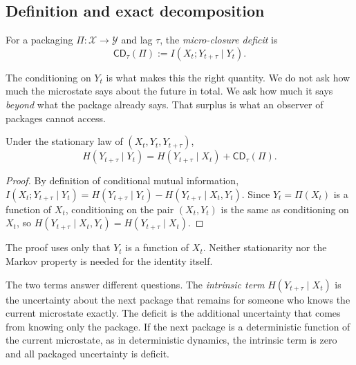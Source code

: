 \subsection{Definition and exact decomposition}

\begin{definition}\label{def:closure-deficit}
For a packaging $\Pi:\mathcal{X}\to\mathcal{Y}$ and lag $\tau$, the \emph{micro-closure deficit} is
\begin{equation}
\mathsf{CD}_\tau(\Pi)
:=
I(X_t; Y_{t+\tau} \mid Y_t).
\label{eq:closure-deficit}
\end{equation}
\end{definition}

The conditioning on $Y_t$ is what makes this the right quantity. We do not ask how much the microstate says about the future in total. We ask how much it says \emph{beyond} what the package already says. That surplus is what an observer of packages cannot access.

\begin{proposition}\label{prop:cd-decomposition}
Under the stationary law of $(X_t,Y_t,Y_{t+\tau})$,
\begin{equation}
H(Y_{t+\tau}\mid Y_t)
=
H(Y_{t+\tau}\mid X_t)
+
\mathsf{CD}_\tau(\Pi).
\label{eq:cd-decomposition}
\end{equation}
\end{proposition}

\begin{proof}
By definition of conditional mutual information,
$I(X_t;Y_{t+\tau}\mid Y_t)=H(Y_{t+\tau}\mid Y_t)-H(Y_{t+\tau}\mid X_t,Y_t)$.
Since $Y_t=\Pi(X_t)$ is a function of $X_t$, conditioning on the pair $(X_t,Y_t)$ is the same as conditioning on $X_t$, so $H(Y_{t+\tau}\mid X_t,Y_t)=H(Y_{t+\tau}\mid X_t)$.
\end{proof}

The proof uses only that $Y_t$ is a function of $X_t$. Neither stationarity nor the Markov property is needed for the identity itself.

The two terms answer different questions. The \emph{intrinsic term} $H(Y_{t+\tau}\mid X_t)$ is the uncertainty about the next package that remains for someone who knows the current microstate exactly. The deficit is the additional uncertainty that comes from knowing only the package. If the next package is a deterministic function of the current microstate, as in deterministic dynamics, the intrinsic term is zero and all packaged uncertainty is deficit.


